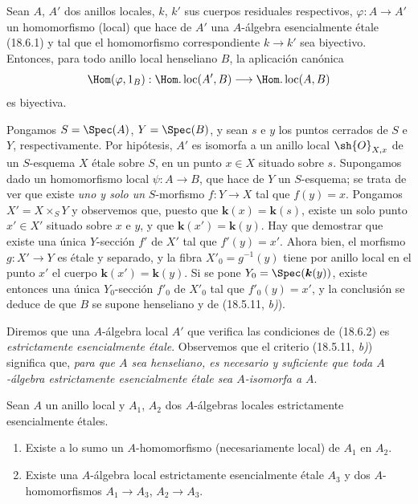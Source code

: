 \begin{lemma}[18.6.2]
\label{IV.18.6.2}
Sean $A$, $A'$ dos anillos locales, $k$, $k'$ sus cuerpos residuales respectivos, $\varphi:A\to A'$ un homomorfismo (local) que hace de $A'$ una $A$-álgebra esencialmente étale \textup{(18.6.1)} y tal que el homomorfismo correspondiente $k\to k'$ sea biyectivo. Entonces, para todo anillo local \textup{henseliano} $B$, la aplicación canónica
\[
  \Hom(\varphi,1_B):\Hom.\operatorname{loc}(A',B)\longrightarrow\Hom.\operatorname{loc}(A,B)
\]
es biyectiva.
\end{lemma}

Pongamos $S=\Spec(A)$, $Y=\Spec(B)$, y sean $s$ e $y$ los puntos cerrados de $S$ e $Y$, respectivamente. Por hipótesis, $A'$ es isomorfa a un anillo local $\sh{O}_{X,x}$ de un $S$-esquema $X$ étale sobre $S$, en un punto $x\in X$ situado sobre $s$. Supongamos dado un homomorfismo local $\psi:A\to B$, que hace de $Y$ un $S$-esquema; se trata de ver que existe \emph{uno y solo un} $S$-morfismo $f:Y\to X$ tal que $f(y)=x$. Pongamos $X'=X\times_S Y$ y observemos que, puesto que $\boldsymbol k(x)=\boldsymbol k(s)$, existe un solo punto $x'\in X'$ situado sobre $x$ e $y$, y que $\boldsymbol k(x')=\boldsymbol k(y)$. Hay que demostrar que existe una única $Y$-sección $f'$ de $X'$ tal que $f'(y)=x'$. Ahora bien, el morfismo $g:X'\to Y$ es étale y separado, y la fibra $X'_0=g^{-1}(y)$ tiene por anillo local en el punto $x'$ el cuerpo $\boldsymbol k(x')=\boldsymbol k(y)$. Si se pone $Y_0=\Spec(\boldsymbol k(y))$, existe entonces una única $Y_0$-sección $f'_0$ de $X'_0$ tal que $f'_0(y)=x'$, y la conclusión se deduce de que $B$ se supone henseliano y de (18.5.11, \emph{b)}).

Diremos que una $A$-álgebra local $A'$ que verifica las condiciones de (18.6.2) es \emph{estrictamente esencialmente étale}. Observemos que el criterio (18.5.11, \emph{b)}) significa que, \emph{para que $A$ sea henseliano, es necesario y suficiente que toda $A$-álgebra estrictamente esencialmente étale sea $A$-isomorfa a $A$}.

\begin{lemma}[18.6.3]
\label{IV.18.6.3}
Sean $A$ un anillo local y $A_1$, $A_2$ dos $A$-álgebras locales estrictamente esencialmente étales.
\begin{enumerate}
  \item[\textup{(i)}] Existe a lo sumo un $A$-homomorfismo (necesariamente local) de $A_1$ en $A_2$.
  \item[\textup{(ii)}] Existe una $A$-álgebra local estrictamente esencialmente étale $A_3$ y dos $A$-homomorfismos $A_1\to A_3$, $A_2\to A_3$.
\end{enumerate}
\end{lemma}

